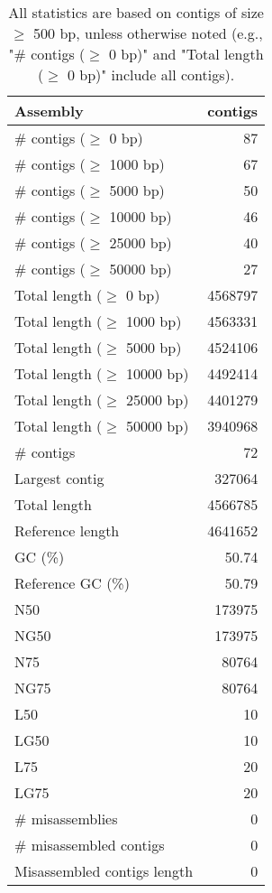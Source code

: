 \documentclass[12pt,a4paper]{article}
\begin{document}
\begin{table}[ht]
\begin{center}
\caption{All statistics are based on contigs of size $\geq$ 500 bp, unless otherwise noted (e.g., "\# contigs ($\geq$ 0 bp)" and "Total length ($\geq$ 0 bp)" include all contigs).}
\begin{tabular}{|l*{1}{|r}|}
\hline
Assembly & contigs \\ \hline
\# contigs ($\geq$ 0 bp) & 87 \\ \hline
\# contigs ($\geq$ 1000 bp) & 67 \\ \hline
\# contigs ($\geq$ 5000 bp) & 50 \\ \hline
\# contigs ($\geq$ 10000 bp) & 46 \\ \hline
\# contigs ($\geq$ 25000 bp) & 40 \\ \hline
\# contigs ($\geq$ 50000 bp) & 27 \\ \hline
Total length ($\geq$ 0 bp) & 4568797 \\ \hline
Total length ($\geq$ 1000 bp) & 4563331 \\ \hline
Total length ($\geq$ 5000 bp) & 4524106 \\ \hline
Total length ($\geq$ 10000 bp) & 4492414 \\ \hline
Total length ($\geq$ 25000 bp) & 4401279 \\ \hline
Total length ($\geq$ 50000 bp) & 3940968 \\ \hline
\# contigs & 72 \\ \hline
Largest contig & 327064 \\ \hline
Total length & 4566785 \\ \hline
Reference length & 4641652 \\ \hline
GC (\%) & 50.74 \\ \hline
Reference GC (\%) & 50.79 \\ \hline
N50 & 173975 \\ \hline
NG50 & 173975 \\ \hline
N75 & 80764 \\ \hline
NG75 & 80764 \\ \hline
L50 & 10 \\ \hline
LG50 & 10 \\ \hline
L75 & 20 \\ \hline
LG75 & 20 \\ \hline
\# misassemblies & 0 \\ \hline
\# misassembled contigs & 0 \\ \hline
Misassembled contigs length & 0 \\ \hline

\end{tabular}
\end{center}
\end{table}
\end{document}
